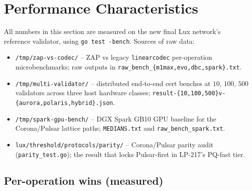 \section{Performance Characteristics}
\label{sec:performance}

All numbers in this section are measured on the new final Lux
network's reference validator, using \texttt{go test -bench}. Sources
of raw data:

\begin{itemize}[leftmargin=2em,nosep]
\item \texttt{/tmp/zap-vs-codec/} -- ZAP vs legacy \texttt{linearcodec}
  per-operation microbenchmarks; raw outputs in
  \texttt{raw\_bench\_\{m1max,evo,dbc,spark\}.txt}.
\item \texttt{/tmp/multi-validator/} -- distributed end-to-end cert
  benches at $10$, $100$, $500$ validators across three host hardware
  classes; \texttt{result-\{10,100,500\}v-\{aurora,polaris,hybrid\}.json}.
\item \texttt{/tmp/spark-gpu-bench/} -- DGX Spark GB10 GPU baseline
  for the Corona/Pulsar lattice paths; \texttt{MEDIANS.txt} and
  \texttt{raw\_bench\_spark.txt}.
\item \texttt{lux/threshold/protocols/parity/} -- Corona/Pulsar parity
  audit (\texttt{parity\_test.go}); the result that locks
  Pulsar-first in LP-217's PQ-fast tier.
\end{itemize}

\subsection{Per-operation wins (measured)}

